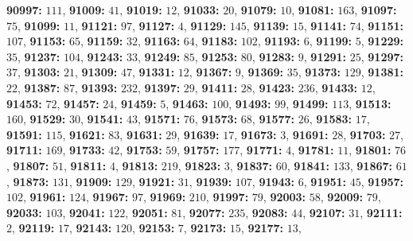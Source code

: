 \textsf{\bfseries 90997:} $111$, \textsf{\bfseries 91009:} $41$, \textsf{\bfseries 91019:} $12$, \textsf{\bfseries 91033:} $20$, \textsf{\bfseries 91079:} $10$, \textsf{\bfseries 91081:} $163$, \textsf{\bfseries 91097:} $75$, \textsf{\bfseries 91099:} $11$, \textsf{\bfseries 91121:} $97$, \textsf{\bfseries 91127:} $4$, \textsf{\bfseries 91129:} $145$, \textsf{\bfseries 91139:} $15$, \textsf{\bfseries 91141:} $74$, \textsf{\bfseries 91151:} $107$, \textsf{\bfseries 91153:} $65$, \textsf{\bfseries 91159:} $32$, \textsf{\bfseries 91163:} $64$, \textsf{\bfseries 91183:} $102$, \textsf{\bfseries 91193:} $6$, \textsf{\bfseries 91199:} $5$, \textsf{\bfseries 91229:} $35$, \textsf{\bfseries 91237:} $104$, \textsf{\bfseries 91243:} $33$, \textsf{\bfseries 91249:} $85$, \textsf{\bfseries 91253:} $80$, \textsf{\bfseries 91283:} $9$, \textsf{\bfseries 91291:} $25$, \textsf{\bfseries 91297:} $37$, \textsf{\bfseries 91303:} $21$, \textsf{\bfseries 91309:} $47$, \textsf{\bfseries 91331:} $12$, \textsf{\bfseries 91367:} $9$, \textsf{\bfseries 91369:} $35$, \textsf{\bfseries 91373:} $129$, \textsf{\bfseries 91381:} $22$, \textsf{\bfseries 91387:} $87$, \textsf{\bfseries 91393:} $232$, \textsf{\bfseries 91397:} $29$, \textsf{\bfseries 91411:} $28$, \textsf{\bfseries 91423:} $236$, \textsf{\bfseries 91433:} $12$, \textsf{\bfseries 91453:} $72$, \textsf{\bfseries 91457:} $24$, \textsf{\bfseries 91459:} $5$, \textsf{\bfseries 91463:} $100$, \textsf{\bfseries 91493:} $99$, \textsf{\bfseries 91499:} $113$, \textsf{\bfseries 91513:} $160$, \textsf{\bfseries 91529:} $30$, \textsf{\bfseries 91541:} $43$, \textsf{\bfseries 91571:} $76$, \textsf{\bfseries 91573:} $68$, \textsf{\bfseries 91577:} $26$, \textsf{\bfseries 91583:} $17$, \textsf{\bfseries 91591:} $115$, \textsf{\bfseries 91621:} $83$, \textsf{\bfseries 91631:} $29$, \textsf{\bfseries 91639:} $17$, \textsf{\bfseries 91673:} $3$, \textsf{\bfseries 91691:} $28$, \textsf{\bfseries 91703:} $27$, \textsf{\bfseries 91711:} $169$, \textsf{\bfseries 91733:} $42$, \textsf{\bfseries 91753:} $59$, \textsf{\bfseries 91757:} $177$, \textsf{\bfseries 91771:} $4$, \textsf{\bfseries 91781:} $11$, \textsf{\bfseries 91801:} $76$, \textsf{\bfseries 91807:} $51$, \textsf{\bfseries 91811:} $4$, \textsf{\bfseries 91813:} $219$, \textsf{\bfseries 91823:} $3$, \textsf{\bfseries 91837:} $60$, \textsf{\bfseries 91841:} $133$, \textsf{\bfseries 91867:} $61$, \textsf{\bfseries 91873:} $131$, \textsf{\bfseries 91909:} $129$, \textsf{\bfseries 91921:} $31$, \textsf{\bfseries 91939:} $107$, \textsf{\bfseries 91943:} $6$, \textsf{\bfseries 91951:} $45$, \textsf{\bfseries 91957:} $102$, \textsf{\bfseries 91961:} $124$, \textsf{\bfseries 91967:} $97$, \textsf{\bfseries 91969:} $210$, \textsf{\bfseries 91997:} $79$, \textsf{\bfseries 92003:} $58$, \textsf{\bfseries 92009:} $79$, \textsf{\bfseries 92033:} $103$, \textsf{\bfseries 92041:} $122$, \textsf{\bfseries 92051:} $81$, \textsf{\bfseries 92077:} $235$, \textsf{\bfseries 92083:} $44$, \textsf{\bfseries 92107:} $31$, \textsf{\bfseries 92111:} $2$, \textsf{\bfseries 92119:} $17$, \textsf{\bfseries 92143:} $120$, \textsf{\bfseries 92153:} $7$, \textsf{\bfseries 92173:} $15$, \textsf{\bfseries 92177:} $13$, 
